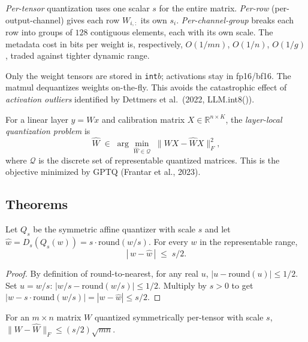 \begin{definition}[Granularity]
\emph{Per-tensor} quantization uses one scalar $s$ for the entire matrix. \emph{Per-row} (per-output-channel) gives each row $W_{i,:}$ its own $s_i$. \emph{Per-channel-group} breaks each row into groups of $128$ contiguous elements, each with its own scale. The metadata cost in bits per weight is, respectively, $O(1/mn)$, $O(1/n)$, $O(1/g)$, traded against tighter dynamic range.
\end{definition}

\begin{definition}
Only the weight tensors are stored in \texttt{int}$b$; activations stay in fp16/bf16. The matmul dequantizes weights on-the-fly. This avoids the catastrophic effect of \emph{activation outliers} identified by Dettmers et al.\ (2022, LLM.int8()).
\end{definition}

\begin{definition}
For a linear layer $y=Wx$ and calibration matrix $X\in\mathbb{R}^{n\times K}$, the \emph{layer-local quantization problem} is
\[
\widehat W \;\in\; \arg\min_{\widehat W \in \mathcal{Q}}\; \big\|WX - \widehat W X\big\|_F^2,
\]
where $\mathcal{Q}$ is the discrete set of representable quantized matrices. This is the objective minimized by GPTQ (Frantar et al., 2023).
\end{definition}

\subsection*{Theorems}

\begin{theorem}\label{thm:rtn}
Let $Q_s$ be the symmetric affine quantizer with scale $s$ and let $\widehat w = D_s(Q_s(w)) = s\cdot\mathrm{round}(w/s)$. For every $w$ in the representable range,
\[
|\,w - \widehat w\,| \;\le\; s/2.
\]
\end{theorem}

\begin{proof}
By definition of round-to-nearest, for any real $u$, $|u - \mathrm{round}(u)|\le 1/2$. Set $u=w/s$: $|w/s - \mathrm{round}(w/s)|\le 1/2$. Multiply by $s>0$ to get $|w - s\cdot\mathrm{round}(w/s)| = |w - \widehat w|\le s/2$.
\end{proof}

\begin{corollary}\label{cor:frob}
For an $m\times n$ matrix $W$ quantized symmetrically per-tensor with scale $s$, $\|W-\widehat W\|_F \le (s/2)\sqrt{mn}$.
\end{corollary}

